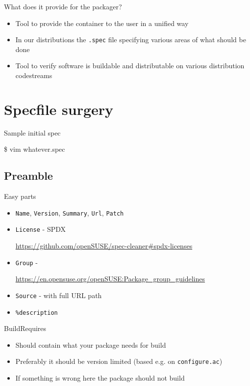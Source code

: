 \documentclass{beamer}
\begin{document}
\begin{frame}[t]{What does it provide for the packager?}
	\begin{itemize}
	\item Tool to provide the container to the user in a unified way
	\item In our distributions the \texttt{.spec} file specifying various areas of what should be done
	\item Tool to verify software is buildable and distributable on various distribution codestreams
	\end{itemize}
\end{frame}

\section{Specfile surgery}

\begin{frame}[t]{Sample initial spec}
	\begin{center}\$ vim whatever.spec\end{center}
\end{frame}

\subsection{Preamble}

\begin{frame}[t]{Easy parts}
	\begin{itemize}
	\item \texttt{Name}, \texttt{Version}, \texttt{Summary}, \texttt{Url}, \texttt{Patch}
	\item \texttt{License} - SPDX \begin{small}\url{https://github.com/openSUSE/spec-cleaner\#spdx-licenses}\end{small}
    \item \texttt{Group} - \begin{small}\url{https://en.opensuse.org/openSUSE:Package\_group\_guidelines}\end{small}
    \item \texttt{Source} - with full URL path
    \item \texttt{\%description}
	\end{itemize}
\end{frame}

\begin{frame}[t]{BuildRequires}
	\begin{itemize}
	\item Should contain what your package needs for build
    \item Preferably it should be version limited (based e.g. on \texttt{configure.ac})
    \item If something is wrong here the package should not build
	\end{itemize}
\end{frame}
\end{document}
